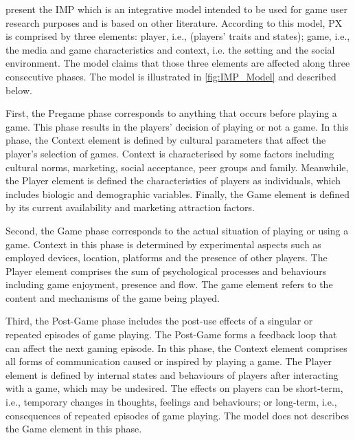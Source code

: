\textcite{Elson2014} present the \ac{IMP} which is an integrative model intended to be used for game user research purposes and is based on other literature. According to this model, \ac{PX} is comprised by three elements: player, i.e., (players' traits and states); game, i.e., the media and game characteristics and context, i.e. the setting and the social environment. The model claims that those three elements are affected along three consecutive phases. The model is illustrated in \autoref{fig:IMP_Model} and described below.

First, the Pregame phase corresponds to anything that occurs before playing a game. This phase results in the players' decision of playing or not a game. In this phase, the Context element is defined by cultural parameters that affect the player's selection of games. Context is characterised by some factors including cultural norms, marketing, social acceptance, peer groups and family. Meanwhile, the Player element is defined the characteristics of players as individuals, which includes biologic and demographic variables. Finally, the Game element is defined by its current availability and marketing attraction factors.

Second, the Game phase corresponds to the actual situation of playing or using a game. Context in this phase is determined by experimental aspects such as employed devices, location, platforms and the presence of other players. The Player element comprises the sum of psychological processes and behaviours including game enjoyment, presence and flow. The game element refers to the content and mechanisms of the game being played.

Third, the Post-Game phase includes the post-use effects of a singular or repeated episodes of game playing. The Post-Game forms a feedback loop that can affect the next gaming episode. In this phase, the Context element comprises all forms of communication caused or inspired by playing a game. The Player element is defined by internal states and behaviours of players after interacting with a game, which may be undesired. The effects on players can be short-term, i.e., temporary changes in thoughts, feelings and behaviours; or long-term, i.e., consequences of repeated episodes of game playing. The model does not describes the Game element in this phase.

